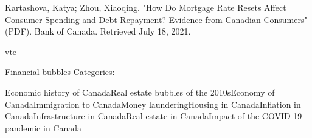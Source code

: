     Kartashova, Katya; Zhou, Xiaoqing. "How Do Mortgage Rate Resets Affect Consumer Spending and Debt Repayment? Evidence from Canadian Consumers" (PDF). Bank of Canada. Retrieved July 18, 2021.

    vte

Financial bubbles
Categories:

    Economic history of CanadaReal estate bubbles of the 2010sEconomy of CanadaImmigration to CanadaMoney launderingHousing in CanadaInflation in CanadaInfrastructure in CanadaReal estate in CanadaImpact of the COVID-19 pandemic in Canada

